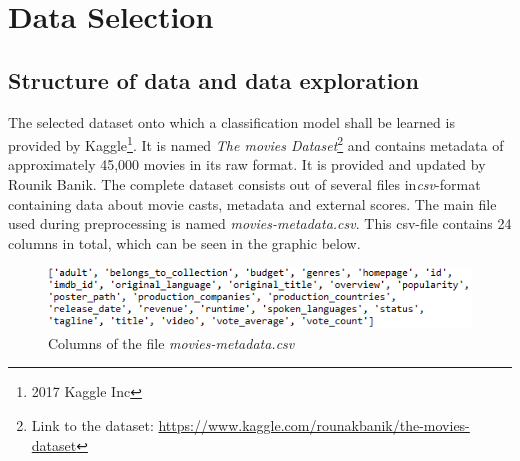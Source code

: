 \chapter{Data Selection}
\label{cha:data_selection}

\section{Structure of data and data exploration}
\label{sec:data_exploration}
The selected dataset onto which a classification model shall be learned is provided by Kaggle\footnote{2017 Kaggle Inc}. It is named \textit{The movies Dataset}\footnote{Link to the dataset: \hyperref[https://www.kaggle.com/rounakbanik/the-movies-dataset]{https://www.kaggle.com/rounakbanik/the-movies-dataset}} and contains metadata of approximately 45,000 movies in its raw format. It is provided and updated by Rounik Banik. The complete dataset consists out of several files in\textit{csv}-format containing data about movie casts, metadata and external scores. The main file used during preprocessing is named \textit{movies-metadata.csv}. This csv-file contains 24 columns in total, which can be seen in the graphic below.
\begin{figure}[ht]
	\centering
		\includegraphics[width=\textwidth]{images/Raw_dataset_headers.png}
	\caption{Columns of the file \textit{movies-metadata.csv}}
\end{figure}


